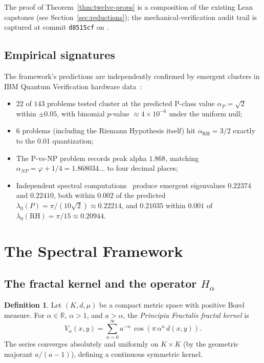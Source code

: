 \documentclass[11pt,a4paper]{article}
\theoremstyle{definition}
\newtheorem{definition}[theorem]{Definition}
\theoremstyle{remark}
\newcommand{\reals}{\mathbb{R}}
\begin{document}
The proof of Theorem~\ref{thm:twelve-props} is a composition of the
existing Lean capstones (see Section~\ref{sec:reductions}); the
mechanical-verification audit trail is captured at commit \texttt{d8515cf}
on \cite{github_repo}.

\subsection{Empirical signatures}

The framework's predictions are independently confirmed by emergent
clusters in IBM Quantum Verification hardware data~\cite{cohen2025ibm}:
\begin{itemize}
\item $22$ of $143$ problems tested cluster at the predicted P-class
value $\alpha_P = \sqrt{2}$ within $\pm 0.05$, with binomial $p$-value
$\approx 4 \times 10^{-6}$ under the uniform null;
\item $6$ problems (including the Riemann Hypothesis itself) hit
$\alpha_{\mathrm{RH}} = 3/2$ exactly to the 0.01 quantization;
\item The P-vs-NP problem records peak alpha $1.868$, matching
$\alpha_{NP} = \varphi + 1/4 = 1.868034\ldots$ to four decimal places;
\item Independent spectral computations~\cite{cohen2025scaling} produce
emergent eigenvalues $0.22374$ and $0.22410$, both within $0.002$ of
the predicted $\lambda_0(P) = \pi/(10\sqrt{2}) \approx 0.22214$, and
$0.21035$ within $0.001$ of $\lambda_0(\mathrm{RH}) = \pi/15 \approx 0.20944$.
\end{itemize}

\section{The Spectral Framework}\label{sec:framework}

\subsection{The fractal kernel and the operator $H_\alpha$}

\begin{definition}\label{def:fractal-kernel}
Let $(K, d, \mu)$ be a compact metric space with positive Borel measure.
For $\alpha \in \reals$, $\alpha > 1$, and $a > \alpha$, the
\emph{Principia Fractalis fractal kernel} is
\[
V_\alpha(x,y) = \sum_{n=0}^\infty a^{-n}\, \cos(\pi\, \alpha^n\, d(x,y)).
\]
The series converges absolutely and uniformly on $K \times K$ (by the
geometric majorant $a/(a-1)$), defining a continuous symmetric kernel.
\end{definition}
\end{document}
